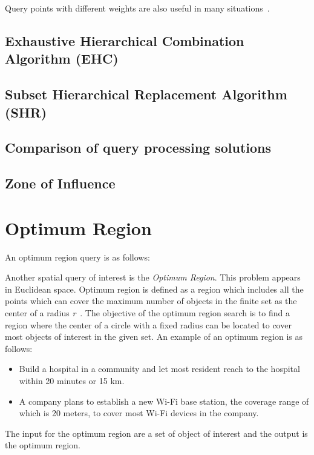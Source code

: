 \documentclass[a4paper,11pt]{article}
\begin{document}
Query points with different weights are also useful in many situations~\cite{deng2012group}.

\subsection{Exhaustive Hierarchical Combination Algorithm (EHC)}

\subsection{Subset Hierarchical Replacement Algorithm (SHR)}

\subsection{Comparison of query processing solutions}

\subsection{Zone of Influence}
 

\section{Optimum Region} 

An optimum region query is as follows: 

Another spatial query of interest is the \textit{Optimum Region}. This problem appears in Euclidean space. Optimum region is defined as a region which includes all the points which can cover the maximum number of objects in the finite set as the center of a radius \textit{r}~\cite{Xuan2012}. The objective of the optimum region search is to find a region where the center of a circle with a fixed radius can be located to cover most objects of interest in the given set. An example of an optimum region is as follows:


\begin{itemize}      
  \item Build a hospital in a community and let most
resident reach to the hospital within 20 minutes or 15 km.      
  \item A company plans to establish a new Wi-Fi base station, the coverage range of
which is 20 meters, to cover most Wi-Fi   devices in the company.
\end{itemize}

The input for the optimum region are a set of object of interest and the output is the optimum region. 
\end{document}
